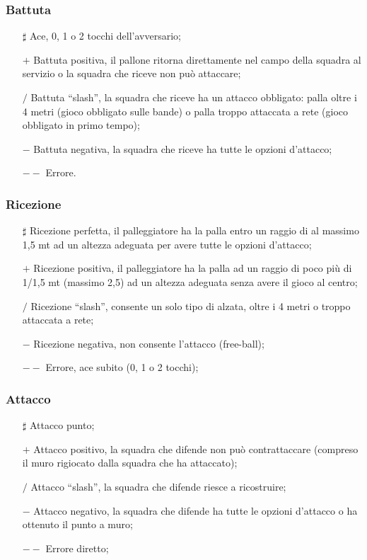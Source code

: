 \subsubsection{Battuta}
\begin{enumerate}
\item[$\sharp$] Ace, 0, 1 o 2 tocchi dell'avversario;
\item[$+$] Battuta positiva, il pallone ritorna direttamente nel campo della squadra al servizio o la squadra che riceve non può attaccare;
\item[$/$] Battuta “slash”, la squadra che riceve ha un attacco obbligato: palla oltre i 4 metri (gioco obbligato sulle bande) o palla troppo attaccata a rete (gioco obbligato in primo tempo);
\item[$-$] Battuta negativa, la squadra che riceve ha tutte le opzioni d'attacco;
\item[$--$] Errore.
\end{enumerate}

\subsubsection{Ricezione}
\begin{enumerate}
\item[$\sharp$] Ricezione perfetta, il palleggiatore ha la palla entro un raggio di al massimo 1,5 mt ad un altezza adeguata per avere tutte le opzioni d'attacco;
\item[$+$] Ricezione positiva, il palleggiatore ha la palla ad un raggio di poco più di 1/1,5 mt (massimo 2,5) ad un altezza adeguata senza avere il gioco al centro;
\item[$/$] Ricezione “slash”, consente un solo tipo di alzata, oltre i 4 metri o troppo attaccata a rete;
\item[$-$] Ricezione negativa, non consente l'attacco (free-ball);
\item[$--$] Errore, ace subito (0, 1 o 2 tocchi);
\end{enumerate}

\subsubsection{Attacco}
\begin{enumerate}
\item[$\sharp$] Attacco punto;
\item[$+$] Attacco positivo, la squadra che difende non può contrattaccare (compreso il muro rigiocato dalla squadra che ha attaccato);
\item[$/$] Attacco “slash”, la squadra che difende riesce a ricostruire;
\item[$-$] Attacco negativo, la squadra che difende ha tutte le opzioni d'attacco o ha ottenuto il punto a muro;
\item[$--$] Errore diretto;
\end{enumerate}

